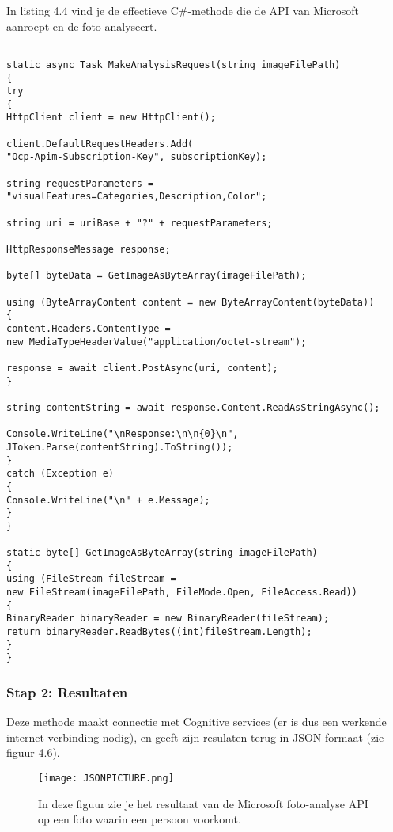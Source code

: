 In listing 4.4 vind je de effectieve C\#-methode die de API van Microsoft aanroept en de foto analyseert. 

\begin{lstlisting}[frame=single, caption={C\# code om te communiceren met de foto-analyse-API van Microsoft.}, captionpos=b]

static async Task MakeAnalysisRequest(string imageFilePath)
{
try
{
HttpClient client = new HttpClient();

client.DefaultRequestHeaders.Add(
"Ocp-Apim-Subscription-Key", subscriptionKey);

string requestParameters =
"visualFeatures=Categories,Description,Color";

string uri = uriBase + "?" + requestParameters;

HttpResponseMessage response;

byte[] byteData = GetImageAsByteArray(imageFilePath);

using (ByteArrayContent content = new ByteArrayContent(byteData))
{
content.Headers.ContentType =
new MediaTypeHeaderValue("application/octet-stream");

response = await client.PostAsync(uri, content);
}

string contentString = await response.Content.ReadAsStringAsync();

Console.WriteLine("\nResponse:\n\n{0}\n",
JToken.Parse(contentString).ToString());
}
catch (Exception e)
{
Console.WriteLine("\n" + e.Message);
}
}

static byte[] GetImageAsByteArray(string imageFilePath)
{
using (FileStream fileStream =
new FileStream(imageFilePath, FileMode.Open, FileAccess.Read))
{
BinaryReader binaryReader = new BinaryReader(fileStream);
return binaryReader.ReadBytes((int)fileStream.Length);
}
}

\end{lstlisting}

\subsubsection{Stap 2: Resultaten}
Deze methode maakt connectie met Cognitive services (er is dus een werkende internet verbinding nodig), en geeft zijn resulaten terug in JSON-formaat (zie figuur 4.6). 
\\
\begin{figure}[h]
    \texttt{[image: JSONPICTURE.png]}
    \caption{In deze figuur zie je het resultaat van de Microsoft foto-analyse API op een foto waarin een persoon voorkomt.}
    \label{fig:jsonfoto}
\end{figure}


